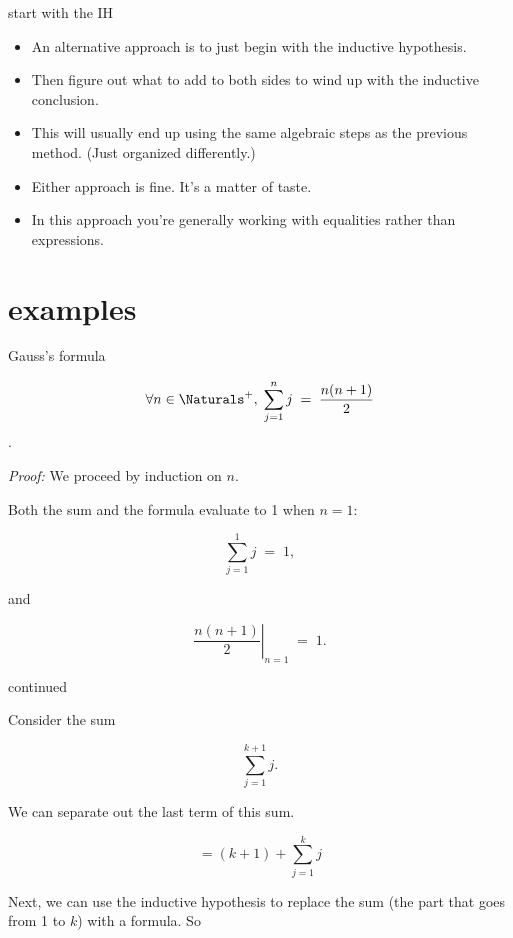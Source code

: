 \documentclass[handout,landscape]{beamer}
\begin{document}
\begin{frame}{start with the IH}
\begin{itemize}
\item An alternative approach is to just begin with the inductive hypothesis. \pause
\item Then figure out what to add to both sides to wind up with the inductive conclusion. \pause
\item This will usually end up using the same algebraic steps as the previous method.\pause \newline
(Just organized differently.) \pause
\item Either approach is fine. It's a matter of taste. \pause
\item In this approach you're generally working with equalities rather than expressions.
\end{itemize}
\end{frame}

\section{examples}

\begin{frame}{Gauss's formula}
\begin{thm*} 
$$ \forall n \in \Naturals^+, \; \sum_{j=1}^{n} j \; = \; \frac{n(n+1)}{2} $$.
\end{thm*}
{\em Proof:} We proceed by induction on $n$.

  Both the sum and the formula evaluate to 1 when $n=1$:

\[ \sum_{j=1}^{1} j \; = \; 1, \]

and 

\[ \left. \frac{n(n+1)}{2} \right|_{n=1} \; = \; 1. \]

\end{frame}

\begin{frame}{continued}

  Consider the sum

\[ \sum_{j=1}^{k+1} j. \]

We can separate out the last term of this sum.

\[ = (k+1) + \sum_{j=1}^{k} j \]

Next, we can use the inductive hypothesis to replace the sum (the part 
that goes from 1 to $k$) with a formula. So 

\end{frame}
\end{document}
